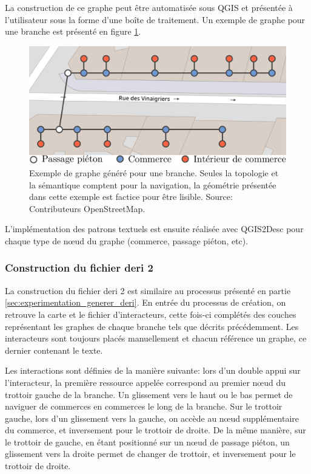 \newpar{}

La construction de ce graphe peut être automatisée sous QGIS et présentée à l'utilisateur sous la forme d'une boîte de traitement. Un exemple de graphe pour une branche est présenté en figure \ref{fig:experimentation_deri2_graphe_branche}.

\begin{figure}[ht]
    \centering
    \includegraphics[width=\textwidth]{images/experimentation/exemple_graphe_poc2.pdf}
    \caption[Exemple de graphe de description de branche]{Exemple de graphe généré pour une branche. Seules la topologie et la sémantique comptent pour la navigation, la géométrie présentée dans cette exemple est factice pour être lisible. Source: Contributeurs OpenStreetMap.}
    \label{fig:experimentation_deri2_graphe_branche}
\end{figure}

L'implémentation des patrons textuels est ensuite réalisée avec QGIS2Desc pour chaque type de nœud du graphe (commerce, passage piéton, etc).

\subsubsection{Construction du fichier \gls{deri} 2}

La construction du fichier \gls{deri} 2 est similaire au processus présenté en partie \ref{sec:experimentation_generer_deri}. En entrée du processus de création, on retrouve la carte et le fichier d'interacteurs, cette fois-ci complétés des couches représentant les graphes de chaque branche tels que décrits précédemment. Les interacteurs sont toujours placés manuellement et chacun référence un graphe, ce dernier contenant le texte.

\newpar{}

Les interactions sont définies de la manière suivante: lors d'un double appui sur l'interacteur, la première ressource appelée correspond au premier nœud du trottoir gauche de la branche. Un glissement vers le haut ou le bas permet de naviguer de commerces en commerces le long de la branche. Sur le trottoir gauche, lors d'un glissement vers la gauche, on accède au nœud supplémentaire du commerce, et inversement pour le trottoir de droite. De la même manière, sur le trottoir de gauche, en étant positionné sur un nœud de passage piéton, un glissement vers la droite permet de changer de trottoir, et inversement pour le trottoir de droite.

